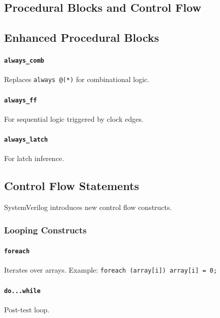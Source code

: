 \subsection{Procedural Blocks and Control Flow}

\subsection{Enhanced Procedural Blocks}
\paragraph{\texttt{always\_comb}} Replaces \texttt{always @(*)} for combinational logic.

\paragraph{\texttt{always\_ff}} For sequential logic triggered by clock edges.

\paragraph{\texttt{always\_latch}} For latch inference.

\subsection{Control Flow Statements}
SystemVerilog introduces new control flow constructs.

\subsubsection{Looping Constructs}
\paragraph{\texttt{foreach}} Iterates over arrays. Example: \texttt{foreach (array[i]) array[i] = 0;}

\paragraph{\texttt{do...while}} Post-test loop.

